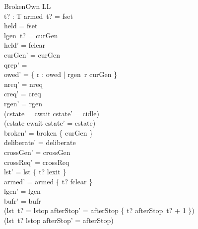 \documentclass[a4paper,10pt,fleqn]{article}
\begin{document}
\begin{schema}{BrokenOwn}
  \Delta LL \\
  t? : T
\where
  armed~t? = fset \\
  held = fset \\
  lgen~t? = curGen \\
  held' = fclear \\
  curGen' = curGen \\
  qrep' = \emptyset \\
  owed' = \{ r : owed | rgen~r \neq curGen \} \\
  nreq' = nreq \\
  creq' = creq \\
  rgen' = rgen \\
  (cstate = cwait \implies cstate' = cidle) \\
  (cstate \neq cwait \implies cstate' = cstate) \\
  broken' = broken \cup \{ curGen \} \\
  deliberate' = deliberate \\
  crossGen' = crossGen \\
  crossReq' = crossReq \\
  lst' = lst \oplus \{ t? \mapsto lexit \} \\
  armed' = armed \oplus \{ t? \mapsto fclear \} \\
  lgen' = lgen \\
  bufr' = bufr \\
  (lst~t? = lstop \implies
    afterStop' = afterStop \oplus \{ t? \mapsto afterStop~t? + 1 \}) \\
  (lst~t? \neq lstop \implies afterStop' = afterStop)
\end{schema}
\end{document}
